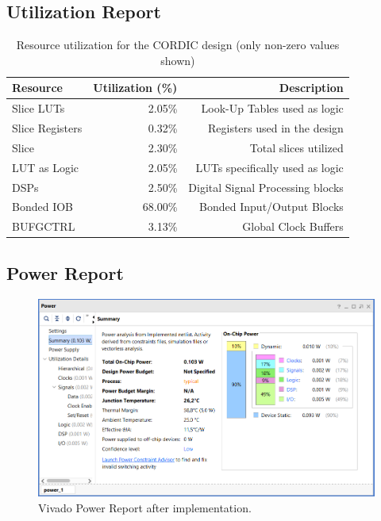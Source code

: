 \subsection{Utilization Report}
\begin{table}[H]
    \centering
    \small
    \captionsetup{skip=10pt} 
    \begin{tabular}{lrr}
        \hline
        Resource               & Utilization (\%) & Description \\
        \hline
        Slice LUTs             & 2.05\%           & Look-Up Tables used as logic \\
        Slice Registers        & 0.32\%           & Registers used in the design \\
        Slice                  & 2.30\%           & Total slices utilized \\
        LUT as Logic           & 2.05\%           & LUTs specifically used as logic \\
        DSPs                   & 2.50\%           & Digital Signal Processing blocks \\
        Bonded IOB             & 68.00\%          & Bonded Input/Output Blocks \\
        BUFGCTRL               & 3.13\%           & Global Clock Buffers \\
        \hline
    \end{tabular}
    \caption{Resource utilization for the CORDIC design (only non-zero values shown)}
    \label{tab:cordic_resource_utilization}
\end{table}


\subsection{Power Report}
\begin{figure}[H]
    \centering
    \captionsetup{skip=10pt} 
    \includegraphics[width=\textwidth]{./images/Vivado/power_report.png}
    \caption{Vivado Power Report after implementation.}
    \label{fig:power_report}
\end{figure}




